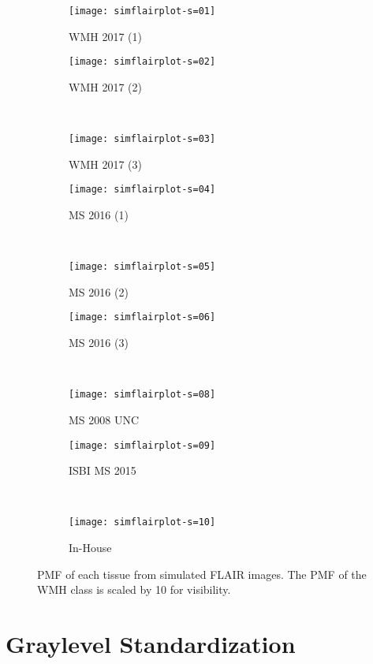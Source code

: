 \begin{figure}
  \centering
  \begin{subfigure}{\plotwidth}\centering\texttt{[image: simflairplot-s=01]}\caption{WMH 2017 (1)}\end{subfigure}
  \begin{subfigure}{\plotwidth}\centering\texttt{[image: simflairplot-s=02]}\caption{WMH 2017 (2)}\end{subfigure}\\[0.5em]
  \begin{subfigure}{\plotwidth}\centering\texttt{[image: simflairplot-s=03]}\caption{WMH 2017 (3)}\end{subfigure}
  \begin{subfigure}{\plotwidth}\centering\texttt{[image: simflairplot-s=04]}\caption{MS  2016 (1)}\end{subfigure}\\[0.5em]
  \begin{subfigure}{\plotwidth}\centering\texttt{[image: simflairplot-s=05]}\caption{MS  2016 (2)}\end{subfigure}
  \begin{subfigure}{\plotwidth}\centering\texttt{[image: simflairplot-s=06]}\caption{MS  2016 (3)}\end{subfigure}\\[0.5em]
  \begin{subfigure}{\plotwidth}\centering\texttt{[image: simflairplot-s=08]}\caption{MS  2008 UNC}\end{subfigure}
  \begin{subfigure}{\plotwidth}\centering\texttt{[image: simflairplot-s=09]}\caption{ISBI MS 2015}\end{subfigure}\\[0.5em]
  \begin{subfigure}{\plotwidth}\centering\texttt{[image: simflairplot-s=10]}\caption{In-House    }\end{subfigure}
  \caption{PMF of each tissue from simulated FLAIR images. The PMF of the WMH class is scaled by 10 for visibility.}
  \label{fig:simflairplot}
\end{figure}
\section{Graylevel Standardization}
